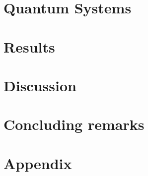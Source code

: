 \documentclass[twocolumn,english,notitlepage]{article}
\begin{document}
\section{Quantum Systems}


\section{Results}


\section{Discussion}


\section{Concluding remarks} 



\renewcommand{\theequation}{\thesection.\arabic{equation}}
\newpage
\section{Appendix}
\begin{appendices}
     
\end{appendices}

\newpage

\end{document}
